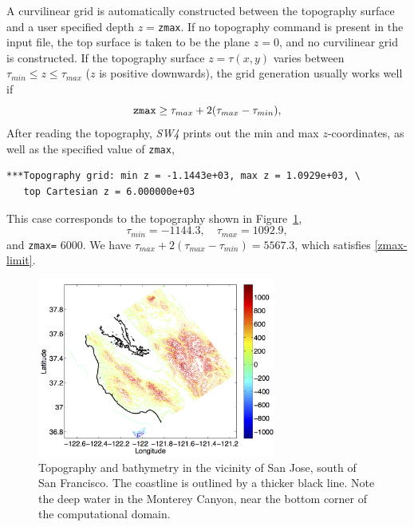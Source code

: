 \documentclass[11pt]{report}
\begin{document}
A curvilinear grid is automatically constructed between the topography surface and a user specified depth
$z=$\verb+zmax+. If no topography command is present in the input file, the top surface is taken to
be the plane $z=0$, and no curvilinear grid is constructed. If the topography surface $z=\tau(x,y)$ varies between
$\tau_{min}\leq z\leq \tau_{max}$ ($z$ is positive downwards), the grid generation usually works well if
\begin{equation}\label{zmax-limit}
\mbox{\tt zmax} \geq \tau_{max} + 2(\tau_{max}-\tau_{min}),
\end{equation}
After reading the topography, \emph{SW4} prints out the min and max $z$-coordinates, as well as the
specified value of \verb+zmax+,
\begin{verbatim}
***Topography grid: min z = -1.1443e+03, max z = 1.0929e+03, \
   top Cartesian z = 6.000000e+03
\end{verbatim}
This case corresponds to the topography shown in Figure~\ref{fig:efile-topo},
\[
\tau_{min} = -1144.3, \quad \tau_{max} = 1092.9,
\]
and \verb+zmax=+ 6000.  We have $\tau_{max} + 2(\tau_{max}-\tau_{min})=5567.3$, which satisfies \eqref{zmax-limit}.
%
\begin{figure}[htp]
  \begin{center}
    \includegraphics[width=0.7\textwidth]{efile-topo.png}
    \caption{Topography and bathymetry in the
      vicinity of San Jose, south of San Francisco. The coastline is outlined by a thicker black
      line. Note the deep water in the Monterey Canyon, near the bottom corner of the computational domain. }
    \label{fig:efile-topo}
  \end{center}
\end{figure}
%
\end{document}
